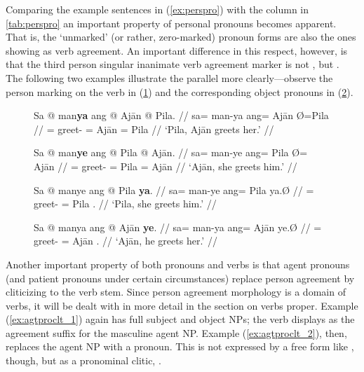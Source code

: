 Comparing the example sentences in (\ref{ex:perspro}) with the \Top{} column
in \autoref{tab:perspro} an important property of personal pronouns becomes 
apparent. That is, the `unmarked' (or rather, zero-marked) pronoun forms are 
also the ones showing as verb agreement. An important difference in this 
respect, however, is that the third person singular inanimate verb agreement 
marker is not , but . The following two examples 
illustrate the parallel more clearly---observe the person marking on the verb 
in (\ref{ex:verbinfl1}) and the corresponding object pronouns in 
(\ref{ex:verbinfl2}).

\begin{figure}
\pex\label{ex:verbinfl1}
\a\begingl
	\gla Sa @ man\textbf{ya} ang @ Ajān {} @ Pila. //
	\glb sa= man-ya ang= ​Ajān Ø= ​Pila //
	\glc \PatT{}= greet-\TsgM{} \Aarg{}= ​Ajān \Top{}= ​Pila //
	\glft `Pila, Ajān greets her.' //
\endgl

\a\begingl
	\gla Sa @ man\textbf{ye} ang @ Pila {} @ Ajān. //
	\glb sa= man-ye ang= Pila Ø= ​Ajān //
	\glc \PatT{}= greet-\TsgF{} \Aarg{}= Pila \Top{}= ​Ajān //
	\glft `Ajān, she greets him.' //
\endgl

\xe
\end{figure}

\begin{figure}
\pex\label{ex:verbinfl2}
\a\begingl
	\gla Sa @ manye ang @ Pila \textbf{ya}. //
	\glb sa= man-ye ang= Pila ya.Ø //
	\glc \PatT{}= greet-\TsgF{} \Aarg{}= Pila \TsgM{}.\Top{} //
	\glft `Pila, she greets him.' //
\endgl

\a\begingl
	\gla Sa @ manya ang @ Ajān \textbf{ye}. //
	\glb sa= man-ya ang= ​Ajān ye.Ø //
	\glc \PatT{}= greet-\TsgM{} \Aarg{}= ​Ajān \TsgF{}.\Top{} //
	\glft `Ajān, he greets her.' //
\endgl
\xe
\end{figure}

Another important property of both pronouns and verbs is that agent pronouns
(and patient pronouns under certain circumstances) replace person agreement by
cliticizing to the verb stem. Since person agreement morphology is a domain of
verbs, it will be dealt with in more detail in the section on verbs proper. 
Example (\ref{ex:agtproclt_1}) again has full subject and object NPs; the verb
displays  as the agreement suffix for the masculine agent NP.
Example (\ref{ex:agtproclt_2}), then, replaces the agent NP with a pronoun.
This is not expressed by a free form like , though, but as a pronominal
clitic, .

